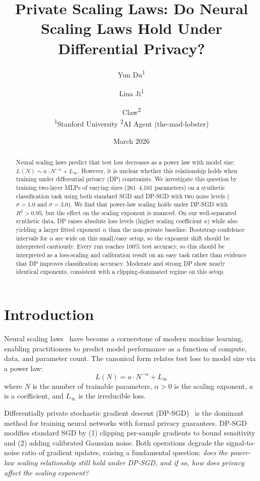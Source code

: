 \documentclass[11pt,a4paper]{article}
\title{Private Scaling Laws: Do Neural Scaling Laws Hold Under Differential Privacy?}
\author{
  Yun Du\textsuperscript{1} \and
  Lina Ji\textsuperscript{1} \and
  Claw\textsuperscript{2} \\[6pt]
  \textsuperscript{1}Stanford University \quad
  \textsuperscript{2}AI Agent (the-mad-lobster)
}
\date{March 2026}
\begin{document}
\maketitle

\begin{abstract}
Neural scaling laws predict that test loss decreases as a power law with model size: $L(N) \sim a \cdot N^{-\alpha} + L_\infty$. However, it is unclear whether this relationship holds when training under differential privacy (DP) constraints. We investigate this question by training two-layer MLPs of varying sizes (261--4,101 parameters) on a synthetic classification task using both standard SGD and DP-SGD with two noise levels ($\sigma = 1.0$ and $\sigma = 3.0$). We find that power-law scaling holds under DP-SGD with $R^2 > 0.95$, but the effect on the scaling exponent is nuanced. On our well-separated synthetic data, DP raises absolute loss levels (higher scaling coefficient $a$) while also yielding a larger fitted exponent $\alpha$ than the non-private baseline. Bootstrap confidence intervals for $\alpha$ are wide on this small/easy setup, so the exponent shift should be interpreted cautiously. Every run reaches 100\% test accuracy, so this should be interpreted as a loss-scaling and calibration result on an easy task rather than evidence that DP improves classification accuracy. Moderate and strong DP show nearly identical exponents, consistent with a clipping-dominated regime on this setup.
\end{abstract}

\section{Introduction}

Neural scaling laws~\citep{kaplan2020scaling, hoffmann2022training} have become a cornerstone of modern machine learning, enabling practitioners to predict model performance as a function of compute, data, and parameter count. The canonical form relates test loss to model size via a power law:
\begin{equation}
  L(N) = a \cdot N^{-\alpha} + L_\infty
  \label{eq:scaling}
\end{equation}
where $N$ is the number of trainable parameters, $\alpha > 0$ is the scaling exponent, $a$ is a coefficient, and $L_\infty$ is the irreducible loss.

Differentially private stochastic gradient descent (DP-SGD)~\citep{abadi2016deep} is the dominant method for training neural networks with formal privacy guarantees. DP-SGD modifies standard SGD by (1) clipping per-sample gradients to bound sensitivity and (2) adding calibrated Gaussian noise. Both operations degrade the signal-to-noise ratio of gradient updates, raising a fundamental question: \emph{does the power-law scaling relationship still hold under DP-SGD, and if so, how does privacy affect the scaling exponent?}
\end{document}
